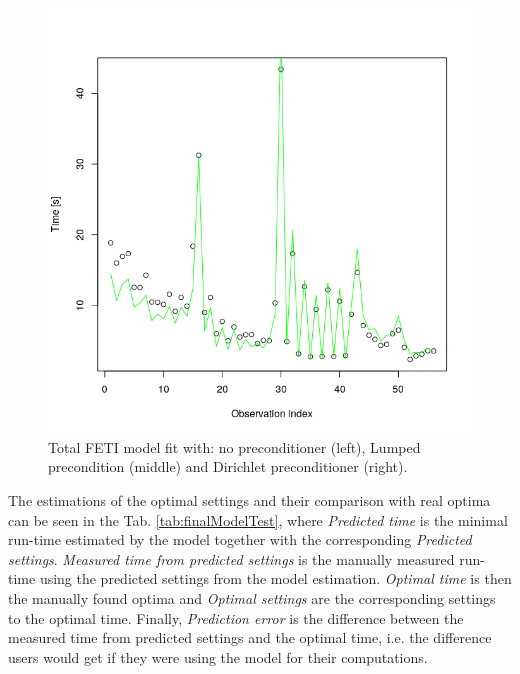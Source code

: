 \begin{figure}[htb]
\begin{minipage}{0.3\textwidth}
\end{minipage}
\begin{minipage}{0.3\textwidth}
\includegraphics[width=\textwidth]{figures/tfeti-dirichlet.png}
\end{minipage}
\caption{Total FETI model fit with: no preconditioner (left), Lumped precondition (middle) and Dirichlet preconditioner (right).}
\label{fig:finalTFETIModel}
\end{figure}

The estimations of the optimal settings and their comparison with real optima can be seen in the Tab. \ref{tab:finalModelTest}, where \textit{Predicted time} is the 
minimal run-time estimated by the model together with the corresponding \textit{Predicted settings}. \textit{Measured time from predicted settings} is the 
manually measured run-time using the predicted settings from the model estimation. 
\textit{Optimal time} is then the manually found optima and \textit{Optimal settings} 
are the corresponding settings to the optimal time. Finally, \textit{Prediction error} is the difference between the measured time from predicted settings and the 
optimal time, i.e. the difference users would get if they were using the model for their computations.

